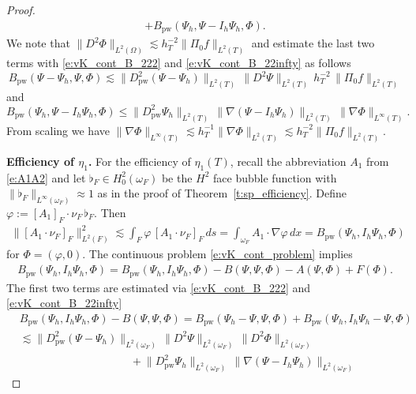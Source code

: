 \documentclass[a4paper]{amsart}
\theoremstyle{definition}
\numberwithin{equation}{section}
\numberwithin{theorem}{section}
\newcommand{\pw}{\mathrm{pw}}
\begin{document}
\begin{proof}
\begin{align*}
           +B_\pw(\Psi_h,\Psi-I_h\Psi_h,\Phi)
        .
    \end{align*}
    We note that $\|D^2 \Phi\|_{L^2(\Omega)}\lesssim h_T^{-2} \|\Pi_0 f\|_{L^2(T)}$
    and estimate the last two terms 
    with \eqref{e:vK_cont_B_222} and \eqref{e:vK_cont_B_22infty}
    as follows
    $$
    B_\pw(\Psi-\Psi_h,\Psi,\Phi)
    \lesssim
    \|D^2_\pw (\Psi-\Psi_h)\|_{L^2(T)}
        \,\|D^2\Psi\|_{L^2(T)}
        \,h_T^{-2}\, \|\Pi_0 f\|_{L^2(T)}
    $$
    and
    $$
    B_\pw(\Psi_h,\Psi-I_h\Psi_h,\Phi)
    \leq
    \|D^2_\pw \Psi_h\|_{L^2(T)}\,
    \|\nabla (\Psi-I_h\Psi_h)\|_{L^2(T)}\,
    \|\nabla \Phi\|_{L^\infty(T)}
    .
    $$
    From scaling we have
    $\|\nabla \Phi\|_{L^\infty(T)}
    \lesssim h_T^{-1} \|\nabla \Phi\|_{L^2(T)}
    \lesssim h_T^{-2} \|\Pi_0 f\|_{L^2(T)}$.

    \textbf{Efficiency of $\eta_1$.}
    For the efficiency of $\eta_1(T)$, recall the abbreviation
    $A_1$ from \eqref{e:A1A2}
    and 
    let $\flat_F\in H^2_0(\omega_F)$ be the $H^2$ face bubble 
    function with $\|\flat_F\|_{L^\infty(\omega_F)}\approx1$
    as in the 
    proof of Theorem~\ref{t:sp_efficiency}.
    Define $\varphi:=[A_1]_F\cdot\nu_F\,\flat_F$.
    Then 
    \begin{align*}
        \lVert [A_1\cdot\nu_F]_F\rVert_{L^2(F)}^2
        \lesssim \int_F  \varphi \, [A_1\cdot \nu_F]_F\,ds 
        = \int_{\omega_F} A_1\cdot \nabla\varphi\,dx
        = B_\pw(\Psi_h,I_h\Psi_h,\Phi)
    \end{align*}
    for $\Phi=(\varphi,0)$. 
    The continuous problem \eqref{e:vK_cont_problem} implies 
    \begin{align*}
        B_\pw(\Psi_h,I_h\Psi_h,\Phi)
        = B_\pw(\Psi_h,I_h\Psi_h,\Phi) -B(\Psi,\Psi,\Phi)-A(\Psi,\Phi) + F(\Phi).
    \end{align*}
    The first two terms are estimated via 
    \eqref{e:vK_cont_B_222} and \eqref{e:vK_cont_B_22infty}
    \begin{align*}
        &B_\pw(\Psi_h,I_h\Psi_h,\Phi) -B(\Psi,\Psi,\Phi)
        = B_\pw(\Psi_h-\Psi,\Psi,\Phi) + B_\pw(\Psi_h,I_h\Psi_h-\Psi,\Phi)\\
        &\lesssim \lVert D_\pw^2 (\Psi-\Psi_h)\rVert_{L^2(\omega_F)} 
            \,\lVert D^2 \Psi\rVert_{L^2(\omega_F)} 
            \,\lVert D^2 \Phi\rVert_{L^2(\omega_F)}  \\
        &\qquad\qquad\qquad\qquad\qquad
            + \lVert D_\pw^2 \Psi_h\rVert_{L^2(\omega_F)} 
            \,\lVert \nabla (\Psi-I_h\Psi_h)\rVert_{L^2(\omega_F)}

\end{align*}
\end{proof}
\end{document}
